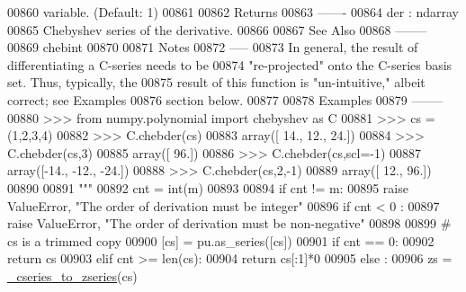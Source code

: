 \begin{DoxyCode}
00860 \textcolor{stringliteral}{        variable. (Default: 1)}
00861 \textcolor{stringliteral}{}
00862 \textcolor{stringliteral}{    Returns}
00863 \textcolor{stringliteral}{    -------}
00864 \textcolor{stringliteral}{    der : ndarray}
00865 \textcolor{stringliteral}{        Chebyshev series of the derivative.}
00866 \textcolor{stringliteral}{}
00867 \textcolor{stringliteral}{    See Also}
00868 \textcolor{stringliteral}{    --------}
00869 \textcolor{stringliteral}{    chebint}
00870 \textcolor{stringliteral}{}
00871 \textcolor{stringliteral}{    Notes}
00872 \textcolor{stringliteral}{    -----}
00873 \textcolor{stringliteral}{    In general, the result of differentiating a C-series needs to be}
00874 \textcolor{stringliteral}{    "re-projected" onto the C-series basis set. Thus, typically, the}
00875 \textcolor{stringliteral}{    result of this function is "un-intuitive," albeit correct; see Examples}
00876 \textcolor{stringliteral}{    section below.}
00877 \textcolor{stringliteral}{}
00878 \textcolor{stringliteral}{    Examples}
00879 \textcolor{stringliteral}{    --------}
00880 \textcolor{stringliteral}{    >>> from numpy.polynomial import chebyshev as C}
00881 \textcolor{stringliteral}{    >>> cs = (1,2,3,4)}
00882 \textcolor{stringliteral}{    >>> C.chebder(cs)}
00883 \textcolor{stringliteral}{    array([ 14.,  12.,  24.])}
00884 \textcolor{stringliteral}{    >>> C.chebder(cs,3)}
00885 \textcolor{stringliteral}{    array([ 96.])}
00886 \textcolor{stringliteral}{    >>> C.chebder(cs,scl=-1)}
00887 \textcolor{stringliteral}{    array([-14., -12., -24.])}
00888 \textcolor{stringliteral}{    >>> C.chebder(cs,2,-1)}
00889 \textcolor{stringliteral}{    array([ 12.,  96.])}
00890 \textcolor{stringliteral}{}
00891 \textcolor{stringliteral}{    """}
00892     cnt = int(m)
00893 
00894     \textcolor{keywordflow}{if} cnt != m:
00895         \textcolor{keywordflow}{raise} ValueError, \textcolor{stringliteral}{"The order of derivation must be integer"}
00896     \textcolor{keywordflow}{if} cnt < 0 :
00897         \textcolor{keywordflow}{raise} ValueError, \textcolor{stringliteral}{"The order of derivation must be non-negative"}
00898 
00899     \textcolor{comment}{# cs is a trimmed copy}
00900     [cs] = pu.as\_series([cs])
00901     \textcolor{keywordflow}{if} cnt == 0:
00902         \textcolor{keywordflow}{return} cs
00903     \textcolor{keywordflow}{elif} cnt >= len(cs):
00904         \textcolor{keywordflow}{return} cs[:1]*0
00905     \textcolor{keywordflow}{else} :
00906         zs = \hyperlink{namespacepyneb_1_1utils_1_1chebyshev_a659e346f7cdd9fd058850b26f7e95b17}{\_cseries\_to\_zseries}(cs)

\end{DoxyCode}
